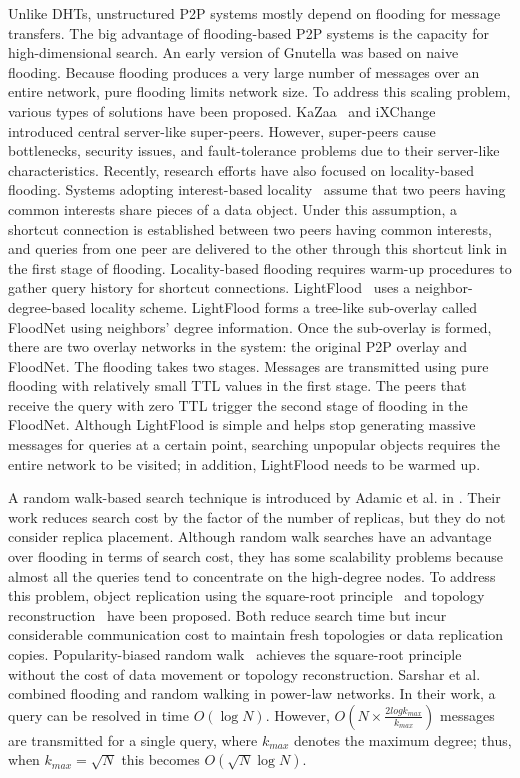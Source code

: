 \documentclass[9.5pt,journal,final,finalsubmission,twocolumn]{IEEEtran}
\begin{document}
Unlike DHTs, unstructured P2P systems mostly depend on flooding 
for message transfers. The big advantage of flooding-based P2P systems 
is the capacity for high-dimensional search.
An early version of Gnutella was based on naive
flooding. Because flooding produces a very large number of
messages over an entire 
network, pure flooding limits network size. 
To address this scaling problem, various types of solutions have been 
proposed. KaZaa~\cite{kazaa} and iXChange~\cite{JohnstoneSM05} 
introduced central server-like super-peers. 
However, super-peers cause bottlenecks, security issues, and
fault-tolerance problems due to their server-like characteristics. 
Recently, research efforts have also focused on locality-based flooding. Systems 
adopting interest-based locality~\cite{Guo04,Guo05,SMZ03} assume that 
two peers having common interests share pieces of a data object. 
Under this assumption, a shortcut 
connection is established between two peers having common interests, 
and queries from one peer are delivered to the other through this 
shortcut link in the first stage of flooding. 
Locality-based flooding requires warm-up procedures to gather query 
history for shortcut connections. 
LightFlood~\cite{JiangGZW08} uses 
a neighbor-degree-based locality scheme. 
LightFlood forms a tree-like sub-overlay called 
FloodNet using neighbors' degree information. Once the sub-overlay 
is formed, there are two overlay networks in the system: the original 
P2P overlay and FloodNet. The flooding takes two stages.
Messages are transmitted using pure flooding with relatively small TTL values 
in the first stage. The peers that receive the query with zero TTL trigger 
the second stage of flooding in the FloodNet. Although 
LightFlood is simple and helps stop generating massive messages 
for queries at a certain point, searching unpopular objects requires  
the entire network to be visited; in addition, LightFlood needs to 
be warmed up.  

A random walk-based search technique is introduced by Adamic et al. 
in \cite{alph:powerlaw01}. 
Their work reduces search cost by the factor of the number of replicas, 
but they do not consider replica placement. 
Although random walk searches have an advantage over flooding
in terms of search cost, they has some
scalability problems because almost all the queries tend to concentrate
on the high-degree nodes. To address this problem, object
replication using the square-root principle~\cite{CohenS02,LCKS02}
and topology reconstruction~\cite{Cooper05} have been proposed. 
Both reduce search time but incur considerable communication cost 
to maintain fresh topologies or data replication copies. 
Popularity-biased random walk~\cite{zs:popularity06}
achieves the square-root principle without the cost of data movement or
topology reconstruction. Sarshar et al. \cite{ns:percolation}
combined flooding and random walking in power-law networks. In their
work, a query can be resolved in time $O(\log N)$. However,
$O(N\times \frac{2log k_{max}}{k_{max}})$ messages are
transmitted for a single query, where $k_{max}$ denotes the maximum
degree; thus, when $k_{max} = \sqrt{N}$ this becomes $O(\sqrt N \log N)$.
\end{document}
